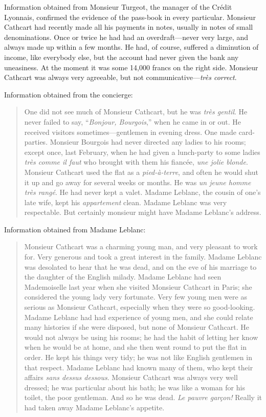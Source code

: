 Information obtained from Monsieur Turgeot, the manager of the Crédit Lyonnais, confirmed the evidence of the pass-book in every particular.  Monsieur Cathcart had recently made all his payments in notes, usually in notes of small denominations. Once or twice he had had an overdraft\allowbreak---\allowbreak never very large, and always made up within a few months. He had, of course, suffered a diminution of income, like everybody else, but the account had never given the bank any uneasiness. At the moment it was some 14,000 francs on the right side. Monsieur Cathcart was always very agreeable, but not communicative---\foreignlanguage{french}{\textit{très correct}}.


Information obtained from the concierge:
\begin{quote}
One did not see much of Monsieur Cathcart, but he was \foreignlanguage{french}{\textit{très gentil}}.  He never failed to say, \foreignquote{french}{\textit{Bonjour, Bourgois},} when he came in or out. He received visitors sometimes\allowbreak---\allowbreak gentlemen in evening dress. One made card-parties. Monsieur Bourgois had never directed any ladies to his rooms; except once, last February, when he had given a lunch-party to some ladies \textit{très comme il faut} who brought with them his fiancée, \foreignlanguage{french}{\textit{une jolie blonde}}. Monsieur Cathcart used the flat as a \foreignlanguage{french}{\textit{pied-à-terre}}, and often he would shut it up and go away for several weeks or months. He was \foreignlanguage{french}{\textit{un jeune homme très rangé}}. He had never kept a valet. Madame Leblanc, the cousin of one's late wife, kept his \textit{appartement} clean. Madame Leblanc was very respectable. But certainly monsieur might have Madame Leblanc's address.
\end{quote}

Information obtained from Madame Leblanc:

\begin{quote}
Monsieur Cathcart was a charming young man, and very pleasant to work for. Very generous and took a great interest in the family. Madame Leblanc was desolated to hear that he was dead, and on the eve of his marriage to the daughter of the English milady. Madame Leblanc had seen Mademoiselle last year when she visited Monsieur Cathcart in Paris; she considered the young lady very fortunate. Very few young men were as serious as Monsieur Cathcart, especially when they were so good-looking. Madame Leblanc had had experience of young men, and she could relate many histories if she were disposed, but none of Monsieur Cathcart. He would not always be using his rooms; he had the habit of letting her know when he would be at home, and she then went round to put the flat in order. He kept his things very tidy; he was not like English gentlemen in that respect. Madame Leblanc had known many of them, who kept their affairs \foreignlanguage{french}{\textit{sans dessus dessous}}. Monsieur Cathcart was always very well dressed; he was particular about his bath; he was like a woman for his toilet, the poor gentleman. And so he was dead. \foreignlanguage{french}{\textit{Le pauvre garçon!}} Really it had taken away Madame Leblanc's appetite.
\end{quote}

